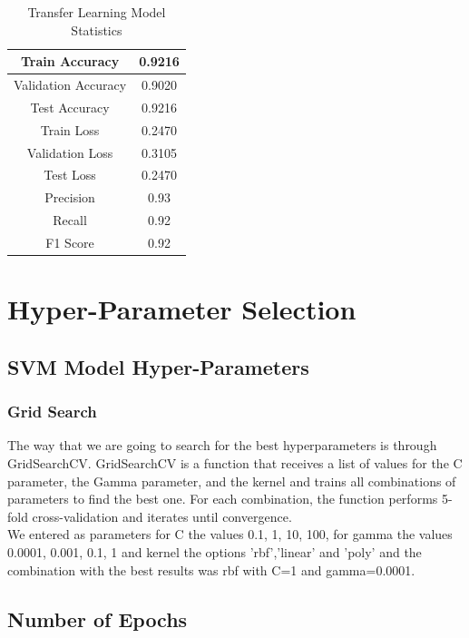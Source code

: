 \documentclass[conference]{IEEEtran}
\begin{document}
\begin{table}[htbp]
\centering
\caption{Transfer Learning Model Statistics}
\begin{center}
\begin{tabular}{|c|c|}
\hline
Train Accuracy & 0.9216 \\
\hline
Validation Accuracy & 0.9020 \\
\hline
Test Accuracy & 0.9216 \\
\hline
Train Loss & 0.2470\\
\hline
Validation Loss & 0.3105 \\
\hline
Test Loss &  0.2470\\
\hline
Precision & 0.93\\
\hline
Recall & 0.92\\
\hline
F1 Score & 0.92 \\
\hline
\end{tabular}
\end{center}
\label{table:3}
\end{table}

\section{Hyper-Parameter Selection}

\subsection{SVM Model Hyper-Parameters}

\subsubsection{Grid Search}
The way that we are going to search for the best hyperparameters is through GridSearchCV. GridSearchCV is a function that receives a list of values for the C parameter, the Gamma parameter, and the kernel and trains all combinations of parameters to find the best one. For each combination, the function performs 5-fold cross-validation and iterates until convergence.\\

We entered as parameters for C the values 0.1, 1, 10, 100, for gamma the values 0.0001, 0.001, 0.1, 1 and kernel the options 'rbf','linear' and 'poly' and the combination with the best results was rbf with C=1 and gamma=0.0001.

\subsection{Number of Epochs}
\end{document}
